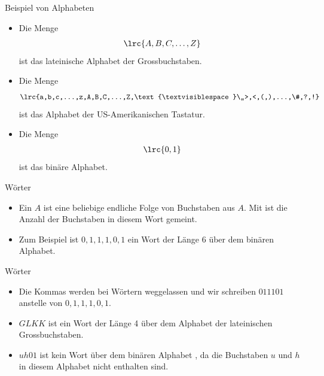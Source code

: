\begin{frame}{Beispiel von Alphabeten}
\begin{itemize}[<+->]
\item
Die Menge
\begin{align*}
    \lrc{A,B,C,\dots, Z}
\end{align*}
ist das lateinische Alphabet der Grossbuchstaben.
\item
Die Menge 
\begin{align*}
    \lrc{a,b,c,...,z,A,B,C,...,Z,\text{\textvisiblespace}\,,>,<,(,),...,\#,?,!}
\end{align*}
ist das Alphabet der US-Amerikanischen Tastatur.
\item Die Menge
\begin{align*}
    \lrc{0,1}
\end{align*}
ist das binäre Alphabet.
\end{itemize}
\end{frame}

\begin{frame}{Wörter}
\begin{itemize}[<+->]
    \item Ein  $A$ ist eine beliebige endliche Folge von Buchstaben aus $A$. Mit  ist die Anzahl der Buchstaben in diesem Wort gemeint.
    \item Zum Beispiel ist $0,1,1,1,0,1$ ein Wort der Länge 6 über dem binären Alphabet.
\end{itemize}
\end{frame}

\begin{frame}{Wörter}
\begin{itemize}[<+->]
    \item Die Kommas werden bei Wörtern weggelassen und wir schreiben $011101$ anstelle von $0,1,1,1,0,1$.
    \item $GLKK$ ist ein Wort der Länge 4 über dem Alphabet der lateinischen Grossbuchstaben.
    \item $uh01$ ist kein Wort über dem binären Alphabet , da die Buchstaben $u$ und $h$ in diesem Alphabet nicht enthalten sind.
\end{itemize}
\end{frame}


